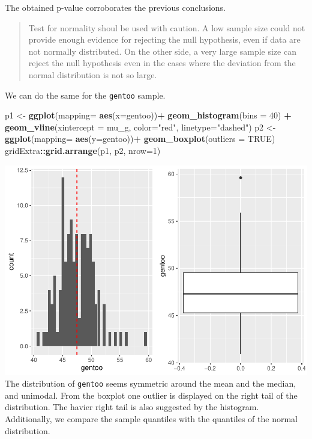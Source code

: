\documentclass[
]{article}
\newenvironment{Shaded}{\begin{snugshade}}{\end{snugshade}}
\newcommand{\AttributeTok}[1]{\textcolor[rgb]{0.13,0.29,0.53}{#1}}
\newcommand{\ConstantTok}[1]{\textcolor[rgb]{0.56,0.35,0.01}{#1}}
\newcommand{\DecValTok}[1]{\textcolor[rgb]{0.00,0.00,0.81}{#1}}
\newcommand{\FunctionTok}[1]{\textcolor[rgb]{0.13,0.29,0.53}{\textbf{#1}}}
\newcommand{\NormalTok}[1]{#1}
\newcommand{\OtherTok}[1]{\textcolor[rgb]{0.56,0.35,0.01}{#1}}
\newcommand{\SpecialCharTok}[1]{\textcolor[rgb]{0.81,0.36,0.00}{\textbf{#1}}}
\newcommand{\StringTok}[1]{\textcolor[rgb]{0.31,0.60,0.02}{#1}}
\begin{document}
The obtained p-value corroborates the previous conclusions.

\begin{quote}
Test for normality shoul be used with caution. A low sample size could
not provide enough evidence for rejecting the null hypothesis, even if
data are not normally distributed. On the other side, a very large
sample size can reject the null hypothesis even in the cases where the
deviation from the normal distribution is not so large.
\end{quote}

We can do the same for the \texttt{gentoo} sample.

\begin{Shaded}
\begin{Highlighting}[]
\NormalTok{p1 }\OtherTok{\textless{}{-}} \FunctionTok{ggplot}\NormalTok{(}\AttributeTok{mapping=} \FunctionTok{aes}\NormalTok{(}\AttributeTok{x=}\NormalTok{gentoo))}\SpecialCharTok{+}
  \FunctionTok{geom\_histogram}\NormalTok{(}\AttributeTok{bins =} \DecValTok{40}\NormalTok{) }\SpecialCharTok{+} 
  \FunctionTok{geom\_vline}\NormalTok{(}\AttributeTok{xintercept =}\NormalTok{ mu\_g, }\AttributeTok{color=}\StringTok{"red"}\NormalTok{, }\AttributeTok{linetype=}\StringTok{"dashed"}\NormalTok{)}
\NormalTok{p2 }\OtherTok{\textless{}{-}} \FunctionTok{ggplot}\NormalTok{(}\AttributeTok{mapping=} \FunctionTok{aes}\NormalTok{(}\AttributeTok{y=}\NormalTok{gentoo))}\SpecialCharTok{+}
  \FunctionTok{geom\_boxplot}\NormalTok{(}\AttributeTok{outliers =} \ConstantTok{TRUE}\NormalTok{)}
\NormalTok{gridExtra}\SpecialCharTok{::}\FunctionTok{grid.arrange}\NormalTok{(p1, p2, }\AttributeTok{nrow=}\DecValTok{1}\NormalTok{)}
\end{Highlighting}
\end{Shaded}

\includegraphics{Tests_and_Applications_files/figure-latex/unnamed-chunk-9-1.pdf}
The distribution of \texttt{gentoo} seems symmetric around the mean and
the median, and unimodal. From the boxplot one outlier is displayed on
the right tail of the distribution. The havier right tail is also
suggested by the histogram. Additionally, we compare the sample
quantiles with the quantiles of the normal distribution.
\end{document}
